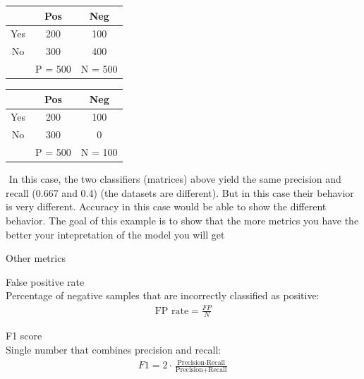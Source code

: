 \begin{center}
\begin{minipage}{0.45\textwidth}
	 \begin{center}
	 \begin{tabular}{|c|c|c|}
		\hline
	 	& Pos & Neg  \\
		\hline
		\hline
	 	Yes & 200 & 100 \\
		\hline
	 	No & 300 & 400 \\
		\hline
	 	   & P =  500 & N = 500 \\
		\hline
	 \end{tabular}
	 \end{center}

\end{minipage}
\hfill
\begin{minipage}{0.45\textwidth}
	 \begin{center}
	 \begin{tabular}{|c|c|c|}
		\hline
	 	& Pos & Neg  \\
		\hline
		\hline
	 	Yes & 200 & 100 \\
		\hline
	 	No & 300 & 0 \\
		\hline
	 	   & P =  500 & N = 100 \\
		\hline
	 \end{tabular}
	 \end{center}
\end{minipage}
\end{center}
\begin{parag}{$ $}
    In this case, the two classifiers (matrices) above yield the same precision and recall (0.667 and 0.4) (the datasets are different). But in this case their behavior is very different. Accuracy in this case would be able to show the different behavior. The goal of this example is to show that the more metrics you have the better your intepretation of the  model you will get
\end{parag}
\begin{parag}{Other metrics}
	\begin{definition}{False positive rate}
		$ $\\
    Percentage of negative samples that are incorrectly classified as positive:
	\begin{align*} 
		\text{FP rate} = \frac{FP}{N}
	\end{align*}
	\end{definition}
	\begin{definition}{F1 score}
		$ $\\
	Single number that combines precision and recall:
	\begin{align*} 
		F1 = 2 \cdot \frac{\text{Precision} \cdot  \text{Recall}}{\text{Precision} + \text{Recall}}
	\end{align*}
	\end{definition}
\end{parag}
